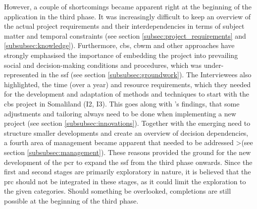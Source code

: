 However, a couple of shortcomings became apparent right at the beginning of the application in the third phase. It was increasingly difficult to keep an overview of the actual project requirements and their interdependencies in terms of subject matter and temporal constraints (see section \ref{subsec:project_requirements} and \ref{subsubsec:knowledge}). Furthermore, \acrshort{cbs}, \acrshort{cbwm} and other approaches have strongly emphasised the importance of embedding the project into prevailing social and decision-making conditions and procedures, which was under-represented in the \acrshort{ssf} (see section \ref{subsubsec:groundwork}). The Interviewees also highlighted, the time (over a year) and resource requirements, which they needed for the development and adaptation of methods and techniques to start with the \acrshort{cbs} project in Somaliland (I2, I3). This goes along with \autocite{garciaFindingWhatYou2021}'s findings, that some adjustments and tailoring always need to be done when implementing a new project (see section \ref{subsubsec:innovations}). Together with the emerging need to structure smaller developments and create an overview of decision dependencies, a fourth area of management became apparent that needed to be addressed >(see section \ref{subsubsec:management}). These reasons provided the ground for the new development of the \acrlong{pcr} to expand the \acrshort{ssf} from the third phase onwards. Since the first and second stages are primarily exploratory in nature, it is believed that the \acrshort{prc} should not be integrated in these stages, as it could limit the exploration to the given categories. Should something be overlooked, completions are still possible at the beginning of the third phase.\newline
